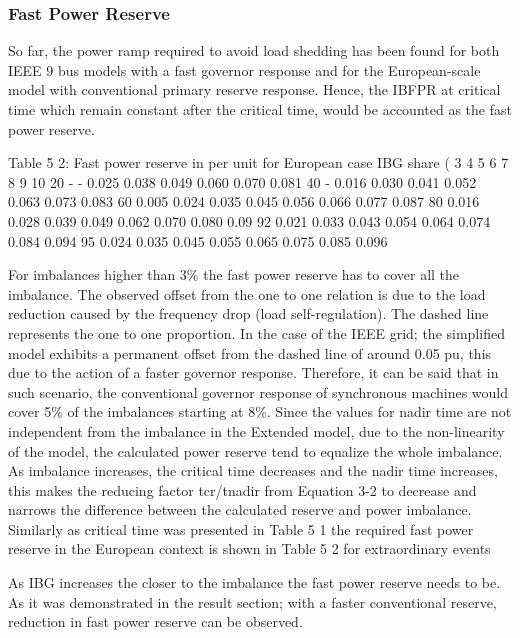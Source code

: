 \subsubsection{Fast Power Reserve}


So far, the power ramp required to avoid load shedding has been found for both IEEE 9 bus models with a fast governor response and for the European-scale model  with conventional primary reserve response. Hence, the IBFPR at critical time which remain constant after the critical time, would be accounted as the fast power reserve. %



Table 5 2: Fast power reserve in per unit for European case
IBG share (%
3	4	5	6	7	8	9	10
20	-	-	0.025	0.038	0.049	0.060	0.070	0.081
40	-	0.016	0.030	0.041	0.052	0.063	0.073	0.083
60	0.005	0.024	0.035	0.045	0.056	0.066	0.077	0.087
80	0.016	0.028	0.039	0.049	0.062	0.070	0.080	0.09
92	0.021	0.033	0.043	0.054	0.064	0.074	0.084	0.094
95	0.024	0.035	0.045	0.055	0.065	0.075	0.085	0.096

For imbalances higher than 3\% the fast power reserve has to cover all the imbalance. The observed offset from the one to one relation is due to the load reduction caused by the frequency drop (load self-regulation). The dashed line represents the one to one proportion. In the case of the IEEE grid; the simplified model exhibits a permanent offset from the dashed line of around 0.05 pu, this due to the action of a faster governor response. Therefore, it can be said that in such scenario, the conventional governor response of synchronous machines would cover 5\% of the imbalances starting at 8\%. Since the values for nadir time are not independent from the imbalance in the Extended model, due to the non-linearity of the model, the calculated power reserve tend to equalize the whole imbalance. As imbalance increases, the critical time decreases and the nadir time increases, this makes the reducing factor tcr/tnadir from Equation 3-2 to decrease and narrows the difference between the calculated reserve and power imbalance.
Similarly as critical time was presented in Table 5 1 the required fast power reserve in the European context is shown in Table 5 2 for extraordinary events


As IBG increases the closer to the imbalance the fast power reserve needs to be. As it was demonstrated in the result section; with a faster conventional reserve, reduction in fast power reserve can be observed.

